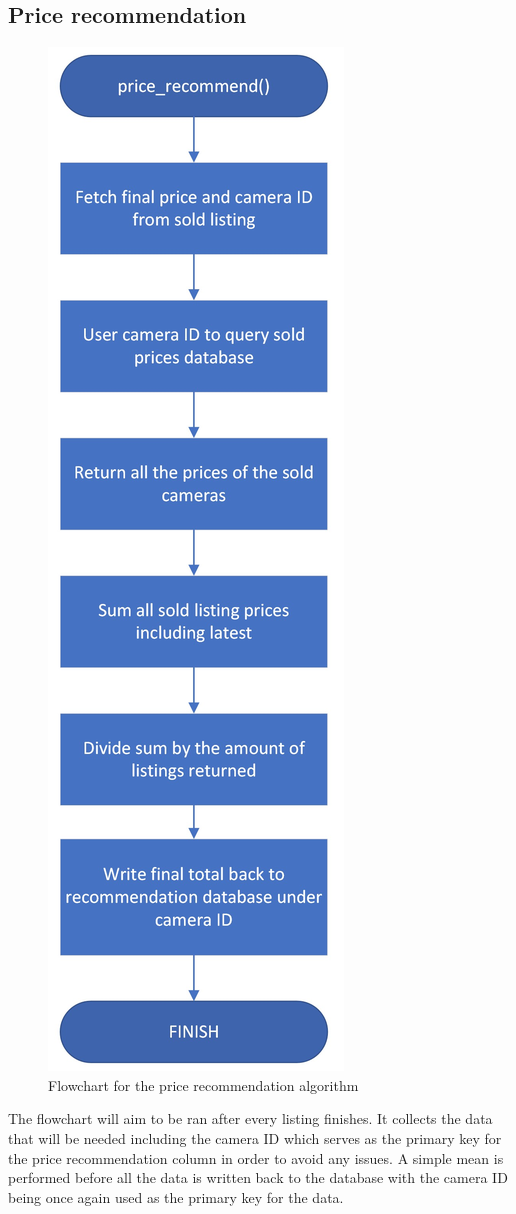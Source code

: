 \subsection{Price recommendation}
\begin{figure}[H]
    \centering
    \includegraphics[scale=0.3]{ch2_design/c3_price.jpeg}
    \caption{Flowchart for the price recommendation algorithm}
    \label{fig:flow_price}
\end{figure}
The flowchart will aim to be ran after every listing finishes. It collects the data that will be needed including the camera ID which serves as the primary key for the price recommendation column in order to avoid any issues. A simple mean is performed before all the data is written back to the database with the camera ID being once again used as the primary key for the data.

